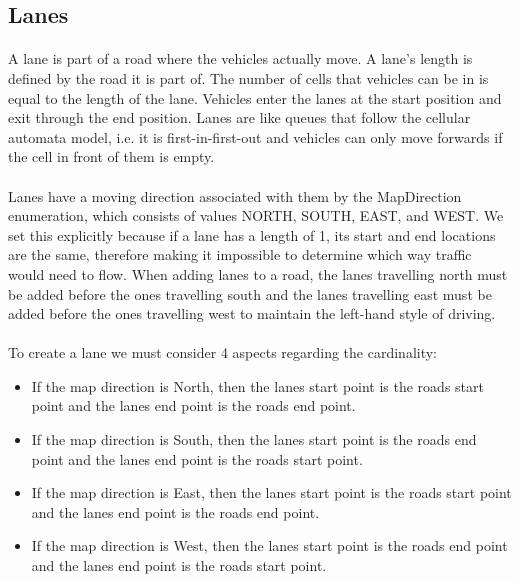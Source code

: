 \documentclass[a4paper,11pt,titlepage]{article}
\begin{document}
\subsection{Lanes}
\paragraph{}
A lane is part of a road where the vehicles actually move. A lane's length is defined by the road it is part of. The number of cells that vehicles can be in is equal to the length of the lane. Vehicles enter the lanes at the start position and exit through the end position. Lanes are like queues that follow the cellular automata model, i.e. it is first-in-first-out and vehicles can only move forwards if the cell in front of them is empty. 
\paragraph{}
Lanes have a moving direction associated with them by the MapDirection enumeration, which consists of values NORTH, SOUTH, EAST, and WEST. We set this explicitly because if a lane has a length of 1, its start and end locations are the same, therefore making it impossible to determine which way traffic would need to flow. When adding lanes to a road, the lanes travelling north must be added before the ones travelling south and the lanes travelling east must be added before the ones travelling west to maintain the left-hand style of driving.
\paragraph{}
To create a lane we must consider 4 aspects regarding the cardinality:
\begin{itemize}
\item If the map direction is North, then the lane\textsc{}s start point is the road\textsc{}s start point and the lane\textsc{}s end point is the road\textsc{}s end point.
\item If the map direction is South, then the lane\textsc{}s start point is the road\textsc{}s end point and the lane\textsc{}s end point is the road\textsc{}s start point.
\item If the map direction is East,  then the lane\textsc{}s start point is the road\textsc{}s start point and the lane\textsc{}s end point is the road\textsc{}s end point.
\item If the map direction is West,  then the lane\textsc{}s start point is the road\textsc{}s end point and the lane\textsc{}s end point is the road\textsc{}s start point.
\end{itemize}
\end{document}
